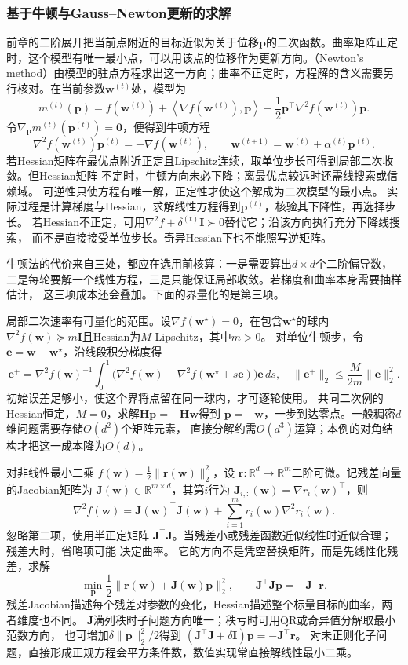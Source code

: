 \subsubsection{基于牛顿与Gauss–Newton更新的求解}
\label{sec:opt-newton-gauss-newton}

前章的二阶展开把当前点附近的目标近似为关于位移$\bm p$的二次函数。曲率矩阵正定时，这个模型有唯一最小点，可以用该点的位移作为更新方向。（Newton's method）由模型的驻点方程求出这一方向；曲率不正定时，方程解的含义需要另行核对。在当前参数$\bm w^{(t)}$处，模型为
\[
  m^{(t)}(\bm{p})
  =
  f(\bm{w}^{(t)})
  +\left\langle\nabla f(\bm{w}^{(t)}),\bm{p}\right\rangle
  +\frac12\bm{p}^{\top}\nabla^2f(\bm{w}^{(t)})\bm{p}.
\]
令$\nabla_{\bm{p}}m^{(t)}(\bm{p}^{(t)})=\bm{0}$，便得到牛顿方程
\[
  \nabla^2 f(\bm{w}^{(t)})\bm{p}^{(t)}
  =-\nabla f(\bm{w}^{(t)}),\qquad
  \bm{w}^{(t+1)}=\bm{w}^{(t)}+\alpha^{(t)}\bm{p}^{(t)}.
\]
若Hessian矩阵在最优点附近正定且Lipschitz连续，取单位步长可得到局部二次收敛。但Hessian矩阵
不定时，牛顿方向未必下降；离最优点较远时还需线搜索或信赖域。
可逆性只使方程有唯一解，正定性才使这个解成为二次模型的最小点。
实际过程是计算梯度与Hessian，求解线性方程得到$\bm p^{(t)}$，核验其下降性，再选择步长。
若Hessian不正定，可用$\nabla^2f+\delta^{(t)}\bm I\succ0$替代它；沿该方向执行充分下降线搜索，
而不是直接接受单位步长。奇异Hessian下也不能照写逆矩阵。

牛顿法的代价来自三处，都应在选用前核算：一是需要算出$d\times d$个二阶偏导数，
二是每轮要解一个线性方程，三是只能保证局部收敛。若梯度和曲率本身需要抽样估计，
这三项成本还会叠加。下面的界量化的是第三项。

局部二次速率有可量化的范围。设$\nabla f(\bm w^\star)=0$，在包含$\bm w^\star$的球内
$\nabla^2f(\bm w)\succeq m\bm I$且Hessian为$M$-Lipschitz，其中$m>0$。
对单位牛顿步，令$\bm e=\bm w-\bm w^\star$，沿线段积分梯度得
\[
 \bm e^+
 =\nabla^2f(\bm w)^{-1}\!
 \int_0^1\bigl(\nabla^2f(\bm w)-\nabla^2f(\bm w^\star+s\bm e)\bigr)\bm e\,ds,
 \quad
 \|\bm e^+\|_2\leq\frac{M}{2m}\|\bm e\|_2^2.
\]
初始误差足够小，使这个界将点留在同一球内，才可逐轮使用。
共同二次例的Hessian恒定，$M=0$，求解$\bm H\bm p=-\bm H\bm w$得到
$\bm p=-\bm w$，一步到达零点。一般稠密$d$维问题需要存储$O(d^2)$个矩阵元素，
直接分解约需$O(d^3)$运算；本例的对角结构才把这一成本降为$O(d)$。

对非线性最小二乘
$f(\bm{w})=\frac12\lVert\bm{r}(\bm{w})\rVert_2^2$，设
$\bm{r}:\mathbb{R}^d\to\mathbb{R}^m$二阶可微。记残差向量的Jacobian矩阵为
$\bm{J}(\bm{w})\in\mathbb{R}^{m\times d}$，其第$i$行为
$\bm{J}_{i,:}(\bm{w})=\nabla r_i(\bm{w})^{\top}$，则
\[
  \nabla^2f(\bm{w})
  =\bm{J}(\bm{w})^{\top}\bm{J}(\bm{w})
  +\sum_{i=1}^m r_i(\bm{w})\nabla^2r_i(\bm{w}).
\]
忽略第二项，使用半正定矩阵
$\bm{J}^{\top}\bm{J}$。当残差小或残差函数近似线性时近似合理；残差大时，省略项可能
决定曲率。
它的方向不是凭空替换矩阵，而是先线性化残差，求解
\[
 \min_{\bm p}\frac12\|\bm r(\bm w)+\bm J(\bm w)\bm p\|_2^2,
 \qquad
 \bm J^\top\bm J\bm p=-\bm J^\top\bm r.
\]
残差Jacobian描述每个残差对参数的变化，Hessian描述整个标量目标的曲率，两者维度也不同。
$\bm J$满列秩时子问题方向唯一；秩亏时可用QR或奇异值分解取最小范数方向，
也可增加$\delta\|\bm p\|_2^2/2$得到
$(\bm J^\top\bm J+\delta\bm I)\bm p=-\bm J^\top\bm r$。
对未正则化子问题，直接形成正规方程会平方条件数，数值实现常直接解线性最小二乘。

